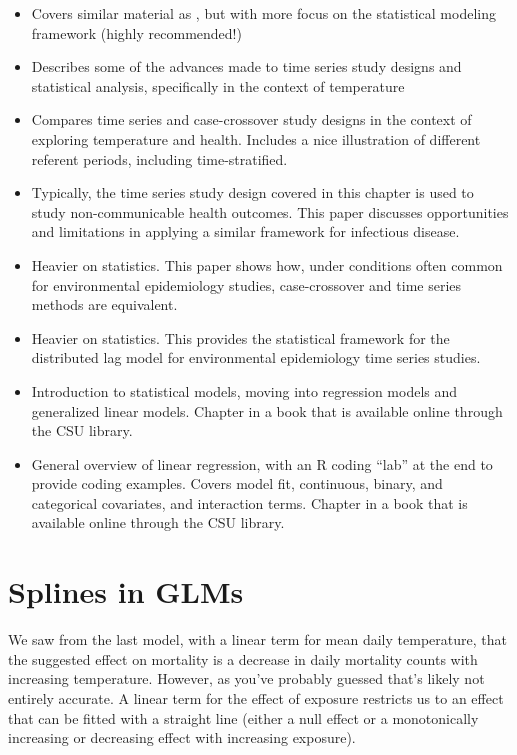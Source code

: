\documentclass[
]{book}
\providecommand{\tightlist}{%
  \setlength{\itemsep}{0pt}\setlength{\parskip}{0pt}}
\begin{document}
\begin{itemize}
\tightlist
\item
  \citet{armstrong2006models} Covers similar material as \citet{bhaskaran2013time}, but with
  more focus on the statistical modeling framework (highly recommended!)
\item
  \citet{gasparrini2010time} Describes some of the advances made to time series study
  designs and statistical analysis, specifically in the context of temperature
\item
  \citet{basu2005temperature} Compares time series and case-crossover study designs in
  the context of exploring temperature and health. Includes a nice illustration
  of different referent periods, including time-stratified.
\item
  \citet{imai2015time} Typically, the time series study design covered in this
  chapter is used to study non-communicable health outcomes. This paper discusses
  opportunities and limitations in applying a similar framework for infectious
  disease.
\item
  \citet{lu2007equivalence} Heavier on statistics. This paper shows how, under
  conditions often common for environmental epidemiology studies, case-crossover
  and time series methods are equivalent.
\item
  \citet{gasparrini2014modeling} Heavier on statistics. This provides the statistical
  framework for the distributed lag model for environmental epidemiology time
  series studies.
\item
  \citet{dunn2018generalized1} Introduction to statistical models, moving into regression models and
  generalized linear models. Chapter in a book that is available online through the CSU library.
\item
  \citet{james2013introduction3} General overview of linear regression, with an R coding
  ``lab'' at the end to provide coding examples. Covers model fit, continuous, binary,
  and categorical covariates, and interaction terms. Chapter in a book that is
  available online through the CSU library.
\end{itemize}

\hypertarget{splines-in-glms}{%
\section{Splines in GLMs}\label{splines-in-glms}}

We saw from the last model, with a linear term for mean daily temperature, that the
suggested effect on mortality is a decrease in daily mortality counts with
increasing temperature. However, as you've probably guessed that's likely not
entirely accurate. A linear term for the effect of exposure restricts us to an
effect that can be fitted with a straight line (either a null effect or a
monotonically increasing or decreasing effect with increasing exposure).
\end{document}
